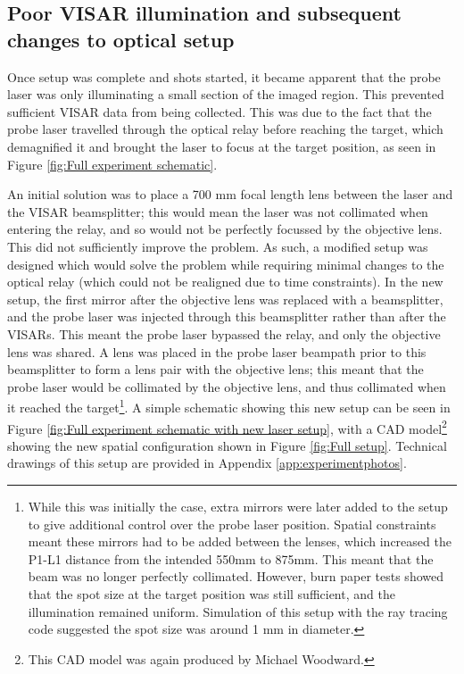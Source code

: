 \subsection{Poor VISAR illumination and subsequent changes to optical setup}

Once setup was complete and shots started, it became apparent that the probe laser was only illuminating a small section of the imaged region. This prevented sufficient VISAR data from being collected. This was due to the fact that the probe laser travelled through the optical relay before reaching the target, which demagnified it and brought the laser to focus at the target position, as seen in Figure \ref{fig:Full experiment schematic}. 

An initial solution was to place a 700 \unit{\milli\meter} focal length lens between the laser and the VISAR beamsplitter; this would mean the laser was not collimated when entering the relay, and so would not be perfectly focussed by the objective lens. This did not sufficiently improve the problem. As such, a modified setup was designed which would solve the problem while requiring minimal changes to the optical relay (which could not be realigned due to time constraints). In the new setup, the first mirror after the objective lens was replaced with a beamsplitter, and the probe laser was injected through this beamsplitter rather than after the VISARs. This meant the probe laser bypassed the relay, and only the objective lens was shared. A lens was placed in the probe laser beampath prior to this beamsplitter to form a lens pair with the objective lens; this meant that the probe laser would be collimated by the objective lens, and thus collimated when it reached the target\footnote{While this was initially the case, extra mirrors were later added to the setup to give additional control over the probe laser position. Spatial constraints meant these mirrors had to be added between the lenses, which increased the P1-L1 distance from the intended 550mm to 875mm. This meant that the beam was no longer perfectly collimated. However, burn paper tests showed that the spot size at the target position was still sufficient, and the illumination remained uniform. Simulation of this setup with the ray tracing code suggested the spot size was around 1 mm in diameter.}. A simple schematic showing this new setup can be seen in Figure \ref{fig:Full experiment schematic with new laser setup}, with a CAD model\footnote{This CAD model was again produced by Michael Woodward.} showing the new spatial configuration shown in Figure \ref{fig:Full setup}. Technical drawings of this setup are provided in Appendix \ref{app:experimentphotos}.

